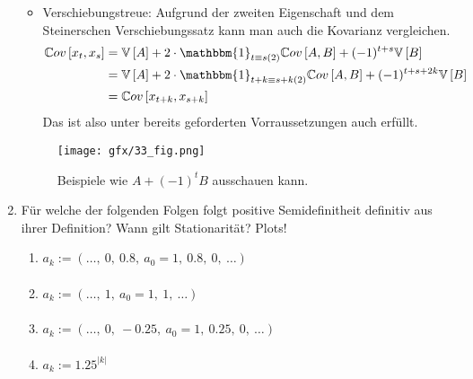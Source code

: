 \documentclass[a4paper,11pt,notitlepage,fullpage]{article}
\newcommand{\Vv}[1]{\mathbb V\left[#1\right]}
\newcommand{\Cov}[1]{\mathbb Cov\left[#1\right]}
\newcommand{\ind}{\mathbbm{1}}
\begin{document}
\begin{enumerate}
\begin{itemize}
\item Verschiebungstreue: Aufgrund der zweiten Eigenschaft und dem Steinerschen Verschiebungssatz kann man auch die Kovarianz vergleichen.
\begin{align*}
\Cov{x_t, x_s} &= \Vv{A} + 2\cdot \ind_{t \equiv s(2)} \Cov{A, B} + (-1)^{t+s} \Vv{B} \\
&= \Vv{A} + 2\cdot \ind_{t + k \equiv s + k(2)} \Cov{A, B} + (-1)^{t+s + 2k} \Vv{B} \\
&=\Cov{x_{t+k}, x_{s+k}}
\end{align*}
Das ist also unter bereits geforderten Vorraussetzungen auch erfüllt.
\end{itemize}
\begin{figure}[h!]
\centering
\texttt{[image: gfx/33\_fig.png]}
\label{fig1}
\caption{Beispiele wie $A+(-1)^tB$ ausschauen kann.}
\end{figure}

\item Für welche der folgenden Folgen folgt positive Semidefinitheit definitiv aus ihrer Definition? Wann gilt Stationarität? Plots!
\begin{enumerate}
\item $a_k := (\ldots, ~0, ~0.8, ~a_0=1, ~0.8, ~0, ~\ldots)$
\begin{align*}
\end{align*}

\item $a_k := (\ldots, ~1, ~a_0=1,  ~1, ~\ldots)$
\begin{align*}
\end{align*}

\item $a_k := (\ldots, ~0, ~-0.25, ~a_0=1, ~0.25, ~0, ~\ldots)$
\begin{align*}
\end{align*}

\item $a_k := 1.25^{|k|}$
\begin{align*}
\end{align*}
\end{enumerate}


\end{enumerate}
\end{document}
